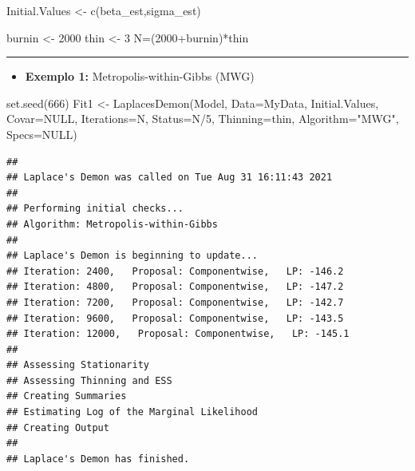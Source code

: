 \documentclass[
]{book}
\newenvironment{Shaded}{\begin{snugshade}}{\end{snugshade}}
\newcommand{\AttributeTok}[1]{\textcolor[rgb]{0.77,0.63,0.00}{#1}}
\newcommand{\ConstantTok}[1]{\textcolor[rgb]{0.00,0.00,0.00}{#1}}
\newcommand{\DecValTok}[1]{\textcolor[rgb]{0.00,0.00,0.81}{#1}}
\newcommand{\FunctionTok}[1]{\textcolor[rgb]{0.00,0.00,0.00}{#1}}
\newcommand{\NormalTok}[1]{#1}
\newcommand{\OtherTok}[1]{\textcolor[rgb]{0.56,0.35,0.01}{#1}}
\newcommand{\SpecialCharTok}[1]{\textcolor[rgb]{0.00,0.00,0.00}{#1}}
\newcommand{\StringTok}[1]{\textcolor[rgb]{0.31,0.60,0.02}{#1}}
\providecommand{\tightlist}{%
  \setlength{\itemsep}{0pt}\setlength{\parskip}{0pt}}
\begin{document}
\begin{Shaded}
\begin{Highlighting}[]
\NormalTok{Initial.Values }\OtherTok{\textless{}{-}} \FunctionTok{c}\NormalTok{(beta\_est,sigma\_est)}

\NormalTok{burnin }\OtherTok{\textless{}{-}} \DecValTok{2000}
\NormalTok{thin }\OtherTok{\textless{}{-}} \DecValTok{3}
\NormalTok{N}\OtherTok{=}\NormalTok{(}\DecValTok{2000}\SpecialCharTok{+}\NormalTok{burnin)}\SpecialCharTok{*}\NormalTok{thin}
\end{Highlighting}
\end{Shaded}

\begin{center}\rule{0.5\linewidth}{0.5pt}\end{center}

\begin{itemize}
\tightlist
\item
  \textbf{Exemplo 1:} Metropolis-within-Gibbs (MWG)
\end{itemize}

\begin{Shaded}
\begin{Highlighting}[]
\FunctionTok{set.seed}\NormalTok{(}\DecValTok{666}\NormalTok{)}
\NormalTok{Fit1 }\OtherTok{\textless{}{-}} \FunctionTok{LaplacesDemon}\NormalTok{(Model, }\AttributeTok{Data=}\NormalTok{MyData, Initial.Values,}
  \AttributeTok{Covar=}\ConstantTok{NULL}\NormalTok{, }\AttributeTok{Iterations=}\NormalTok{N, }\AttributeTok{Status=}\NormalTok{N}\SpecialCharTok{/}\DecValTok{5}\NormalTok{, }\AttributeTok{Thinning=}\NormalTok{thin,}
  \AttributeTok{Algorithm=}\StringTok{"MWG"}\NormalTok{, }\AttributeTok{Specs=}\ConstantTok{NULL}\NormalTok{)}
\end{Highlighting}
\end{Shaded}

\begin{verbatim}
## 
## Laplace's Demon was called on Tue Aug 31 16:11:43 2021
## 
## Performing initial checks...
## Algorithm: Metropolis-within-Gibbs 
## 
## Laplace's Demon is beginning to update...
## Iteration: 2400,   Proposal: Componentwise,   LP: -146.2
## Iteration: 4800,   Proposal: Componentwise,   LP: -147.2
## Iteration: 7200,   Proposal: Componentwise,   LP: -142.7
## Iteration: 9600,   Proposal: Componentwise,   LP: -143.5
## Iteration: 12000,   Proposal: Componentwise,   LP: -145.1
## 
## Assessing Stationarity
## Assessing Thinning and ESS
## Creating Summaries
## Estimating Log of the Marginal Likelihood
## Creating Output
## 
## Laplace's Demon has finished.
\end{verbatim}
\end{document}
